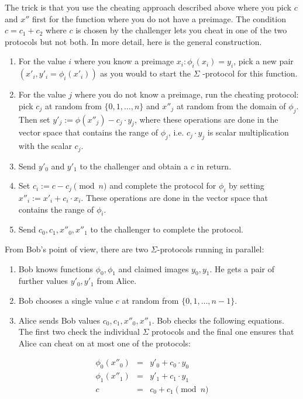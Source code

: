 \documentclass{llncs}
\begin{document}
The trick is that you use the cheating approach described above where you pick
$c$ and $x''$ first for the function where you do not have a preimage. The
condition $c = c_1 + c_2$ where $c$ is chosen by the challenger lets you cheat
in one of the two protocols but not both. In more detail, here is the general
construction.

\begin{enumerate}
\item For the value $i$ where you know a preimage $x_i: \phi_i(x_i) = y_i$,
pick a new pair $(x'_i, y'_i = \phi_i(x'_i))$ as you would to start the $\Sigma$
-protocol for this function.
\item For the value $j$ where you do not know a preimage, run the cheating
protocol: pick $c_j$ at random from $\{0, 1, \ldots, n\}$ and $x''_j$ at random
from the domain of $\phi_j$. Then set $y'_j := \phi(x''_j) - c_j \cdot y_j$,
where these operations are done in the vector space that contains the range of
$\phi_j$, i.e. $c_j \cdot y_j$ is scalar multiplication with the scalar $c_j$.
\item Send $y'_0$ and $y'_1$ to the challenger and obtain a $c$ in return.
\item Set $c_i := c - c_j \pmod{n}$ and complete the protocol for $\phi_i$ by
setting $x''_i := x'_i + c_i \cdot x_i$. These operations are done in the vector
space that contains the range of $\phi_i$.
\item Send $c_0, c_1, x''_0, x''_1$ to the challenger to complete the protocol.
\end{enumerate}

From Bob's point of view, there are two $\Sigma$-protocols running in
parallel:
\begin{enumerate}
\item Bob knows functions $\phi_0, \phi_1$ and claimed images
$y_0, y_1$. He gets a pair of further values $y'_0, y'_1$ from Alice.
\item Bob chooses a single value $c$ at random from $\{0, 1, \ldots, n-1\}$.
\item Alice sends Bob values $c_0, c_1, x''_0, x''_1$. Bob checks the following
equations. The first two check the individual $\Sigma$ protocols and the final
one ensures that Alice can cheat on at most one of the protocols:
\end{enumerate}
\begin{eqnarray}
\phi_0(x''_0) & = & y'_0 + c_0 \cdot y_0 \\
\phi_1(x''_1) & = & y'_1 + c_1 \cdot y_1 \\
c & = & c_0 + c_1 \pmod{n}
\end{eqnarray}
\end{document}
